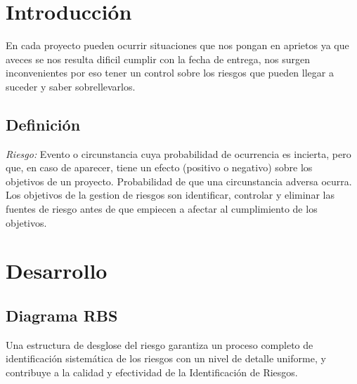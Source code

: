 \documentclass[12pt]{article}
\begin{document}
\maketitle

\tableofcontents

\section{Introducción}
En cada proyecto pueden ocurrir situaciones que nos pongan en aprietos
ya que aveces se nos resulta dificil cumplir con la fecha de entrega,
nos surgen inconvenientes por eso tener un control sobre los riesgos
que pueden llegar a suceder y saber sobrellevarlos.\\ 

\subsection{Definición}
\textit{Riesgo:} Evento o circunstancia cuya probabilidad de ocurrencia es incierta, pero
que, en caso de aparecer, tiene un efecto (positivo o negativo) sobre los\\
objetivos de un proyecto.
Probabilidad de que una circunstancia adversa ocurra.\\

Los objetivos de la gestion de riesgos son identificar, controlar y eliminar las fuentes de riesgo antes de que empiecen a afectar al cumplimiento de los objetivos.\\

\section{Desarrollo}\label{desarrollo}
\subsection{Diagrama RBS}

Una estructura de desglose del riesgo garantiza un proceso completo de identificación sistemática de los riesgos con un nivel de detalle uniforme, y contribuye a la calidad y efectividad de la Identificación de Riesgos.\\

\setlength{\arrayrulewidth}{1mm}
\setlength{\tabcolsep}{5pt}
\renewcommand{\arraystretch}{1.5}
\end{document}
